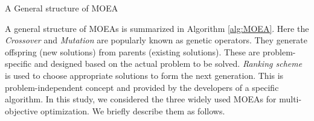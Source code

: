 \begin{algorithm}[!htbp]
	\caption{A General structure of MOEA}
	\begin{algorithmic}[1]\label{alg:MOEA}
		\ENDWHILE
	\end{algorithmic}
\end{algorithm}

A general structure of MOEAs is summarized in Algorithm \ref{alg:MOEA}. Here the \textit{Crossover} and \textit{Mutation} are popularly known as genetic operators. They generate offspring (new solutions) from parents (existing solutions). These are problem-specific and designed based on the actual problem to be solved. \textit{Ranking scheme} is used to choose appropriate solutions to form the next generation. This is problem-independent concept and provided by the developers of a specific algorithm. In this study, we considered the three widely used MOEAs for multi-objective optimization. We briefly describe them as follows.

